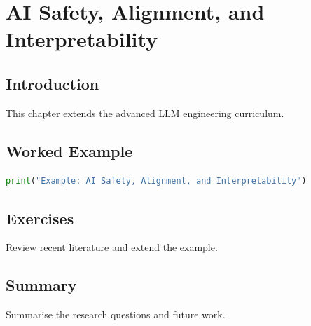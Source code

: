 \chapter{AI Safety, Alignment, and Interpretability}
\label{chap:vol13-8}



\section{Introduction}
This chapter extends the advanced LLM engineering curriculum.

\section{Worked Example}
\begin{lstlisting}[language=Python]
print("Example: AI Safety, Alignment, and Interpretability")
\end{lstlisting}

\section{Exercises}
\begin{exercise}
Review recent literature and extend the example.
\end{exercise}

\section{Summary}
Summarise the research questions and future work.

